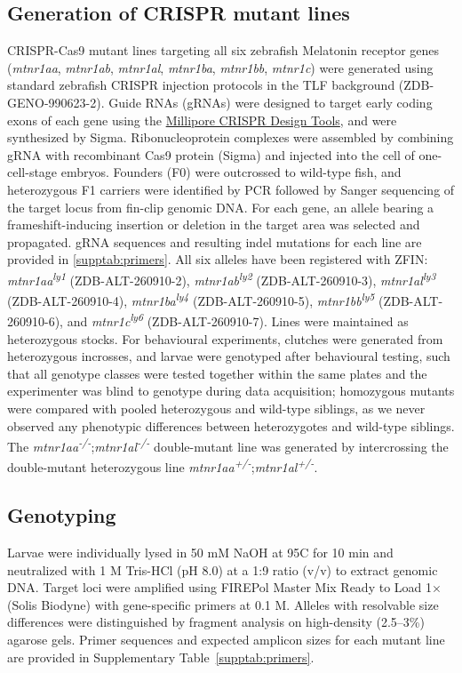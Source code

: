 \documentclass[9.5pt]{RandlettLab_elife}            %
\begin{document}
\subsection{Generation of CRISPR mutant lines}
CRISPR-Cas9 mutant lines targeting all six zebrafish Melatonin receptor genes (\emph{mtnr1aa}, \emph{mtnr1ab}, \emph{mtnr1al}, \emph{mtnr1ba}, \emph{mtnr1bb}, \emph{mtnr1c}) were generated using standard zebrafish CRISPR injection protocols in the TLF background (ZDB-GENO-990623-2).
Guide RNAs (gRNAs) were designed to target early coding exons of each gene using the \href{https://www.milliporesigmabioinfo.com/bioinfo_tools/faces/secured/crispr/crispr.xhtml}{Millipore CRISPR Design Tools}, and were synthesized by Sigma.
Ribonucleoprotein complexes were assembled by combining gRNA with recombinant Cas9 protein (Sigma) and injected into the cell of one-cell-stage embryos.
Founders (F0) were outcrossed to wild-type fish, and heterozygous F1 carriers were identified by PCR followed by Sanger sequencing of the target locus from fin-clip genomic DNA.
For each gene, an allele bearing a frameshift-inducing insertion or deletion in the target area was selected and propagated.
gRNA sequences and resulting indel mutations for each line are provided in \autoref{supptab:primers}.
All six alleles have been registered with ZFIN: \emph{mtnr1aa}\textsuperscript{\emph{ly1}} (ZDB-ALT-260910-2), \emph{mtnr1ab}\textsuperscript{\emph{ly2}} (ZDB-ALT-260910-3), \emph{mtnr1al}\textsuperscript{\emph{ly3}} (ZDB-ALT-260910-4), \emph{mtnr1ba}\textsuperscript{\emph{ly4}} (ZDB-ALT-260910-5), \emph{mtnr1bb}\textsuperscript{\emph{ly5}} (ZDB-ALT-260910-6), and \emph{mtnr1c}\textsuperscript{\emph{ly6}} (ZDB-ALT-260910-7).
Lines were maintained as heterozygous stocks.
For behavioural experiments, clutches were generated from heterozygous incrosses, and larvae were genotyped after behavioural testing, such that all genotype classes were tested together within the same plates and the experimenter was blind to genotype during data acquisition; homozygous mutants were compared with pooled heterozygous and wild-type siblings, as we never observed any phenotypic differences between heterozygotes and wild-type siblings.
The \emph{mtnr1aa\textsuperscript{-/-}};\emph{mtnr1al\textsuperscript{-/-}} double-mutant line was generated by intercrossing the double-mutant heterozygous line \emph{mtnr1aa\textsuperscript{+/-}};\emph{mtnr1al\textsuperscript{+/-}}.

\subsection{Genotyping}
Larvae were individually lysed in 50 mM NaOH at 95\degree C for 10 min and neutralized with 1 M Tris-HCl (pH 8.0) at a 1:9 ratio (v/v) to extract genomic DNA.
Target loci were amplified using FIREPol\textregistered{} Master Mix Ready to Load 1$\times$ (Solis Biodyne) with gene-specific primers at 0.1 \textmu M.
Alleles with resolvable size differences were distinguished by fragment analysis on high-density (2.5--3\%) agarose gels.
Primer sequences and expected amplicon sizes for each mutant line are provided in Supplementary Table~\ref{supptab:primers}.
\end{document}
